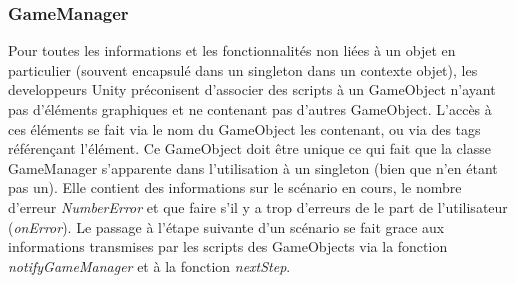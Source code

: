 \subsubsection{GameManager}
Pour toutes les informations et les fonctionnalités non liées à un objet en particulier (souvent encapsulé dans un singleton dans un contexte objet), les developpeurs Unity préconisent d'associer des scripts à un GameObject n'ayant pas d'éléments graphiques et ne contenant pas d'autres GameObject.
L'accès à ces éléments se fait via le nom du GameObject les contenant, ou via des tags référençant l'élément. Ce GameObject doit être unique ce qui fait que la classe GameManager s'apparente dans l'utilisation à un singleton (bien que n'en étant pas un). 
Elle contient des informations sur le scénario en cours, le nombre d'erreur \textit{NumberError} et que faire s'il y a trop d'erreurs de le part de l'utilisateur (\textit{onError}).
Le passage à l'étape suivante d'un scénario se fait grace aux informations transmises par les scripts des GameObjects via la fonction \textit{notifyGameManager} et à la fonction \textit{nextStep}.